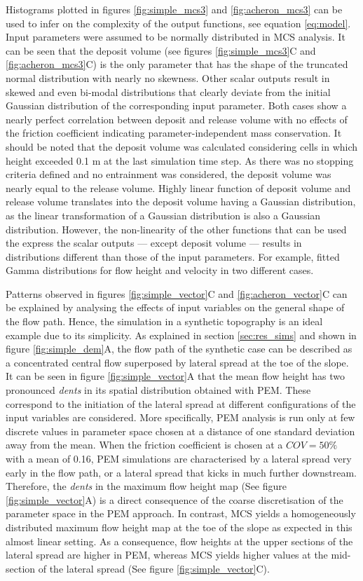 \documentclass[utf8]{FrontiersinHarvard}
\begin{document}
Histograms plotted in figures \ref{fig:simple_mcs3} and \ref{fig:acheron_mcs3} can be used to infer on the complexity of the output functions, see equation \ref{eq:model}. Input parameters were assumed to be normally distributed in MCS analysis. It can be seen that the deposit volume (see figures \ref{fig:simple_mcs3}C and \ref{fig:acheron_mcs3}C) is the only parameter that has the shape of the truncated normal distribution with nearly no skewness. Other scalar outputs result in skewed and even bi-modal distributions that clearly deviate from the initial Gaussian distribution of the corresponding input parameter. Both cases show a nearly perfect correlation between deposit and release volume with no effects of the friction coefficient indicating parameter-independent mass conservation. It should be noted that the deposit volume was calculated considering cells in which height exceeded 0.1 m at the last simulation time step. As there was no stopping criteria defined and no entrainment was considered, the deposit volume was nearly equal to the release volume. Highly linear function of deposit volume and release volume translates into the deposit volume having a Gaussian distribution, as the linear transformation of a Gaussian distribution is also a Gaussian distribution. However, the non-linearity of the other functions that can be used the express the scalar outputs --- except deposit volume --- results in distributions different than those of the input parameters. For example, \citet{Cepeda2013} fitted Gamma distributions for flow height and velocity in two different cases.

Patterns observed in figures \ref{fig:simple_vector}C and \ref{fig:acheron_vector}C can be explained by analysing the effects of input variables on the general shape of the flow path. Hence, the simulation in a synthetic topography is an ideal example due to its simplicity. As explained in section \ref{sec:res_sims} and shown in figure \ref{fig:simple_dem}A, the flow path of the synthetic case can be described as a concentrated central flow superposed by lateral spread at the toe of the slope. It can be seen in figure \ref{fig:simple_vector}A that the mean flow height has two pronounced \textit{dents} in its spatial distribution obtained with PEM. These correspond to the initiation of the lateral spread at different configurations of the input variables are considered. More specifically, PEM analysis is run only at few discrete values in parameter space chosen at a distance of one standard deviation away from the mean. When the friction coefficient is chosen at a $COV=50\%$ with a mean of 0.16, PEM simulations are characterised by a lateral spread very early in the flow path, or a lateral spread that kicks in much further downstream. Therefore, the \textit{dents} in the maximum flow height map (See figure \ref{fig:simple_vector}A) is a direct consequence of the coarse discretisation of the parameter space in the PEM approach. In contrast, MCS yields a homogeneously distributed maximum flow height map at the toe of the slope as expected in this almost linear setting. As a consequence, flow heights at the upper sections of the lateral spread are higher in PEM, whereas MCS yields higher values at the mid-section of the lateral spread (See figure \ref{fig:simple_vector}C).
\end{document}
